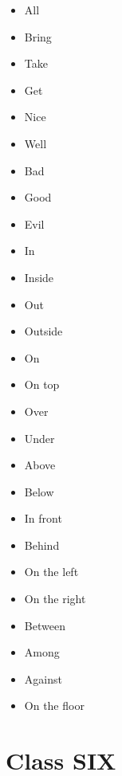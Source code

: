 \documentclass[12pt,a4paper]{article} %
\begin{document}
\begin{itemize}
\item All
\item Bring
\item Take
\item Get
\item Nice
\item Well
\item Bad
\item Good
\item Evil
\item In
\item Inside
\item Out
\item Outside
\item On
\item On top
\item Over
\item Under
\item Above
\item Below
\item In front
\item Behind
\item On the left
\item On the right
\item Between
\item Among
\item Against
\item On the floor
\end{itemize}
\section{Class SIX}
\end{document}
